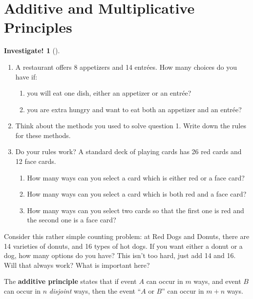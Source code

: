\documentclass[12pt,]{book}
\newcommand{\terminology}[1]{\textbf{#1}}
\theoremstyle{plain}
\theoremstyle{definition}
\theoremstyle{definition}
\theoremstyle{definition}
\newtheorem{investigation}[project]{Investigate!}
\numberwithin{equation}{chapter}
\begin{document}
\section[{Additive and Multiplicative Principles}]{Additive and Multiplicative Principles}\label{sec_counting-addmult}
\begin{investigation}[]\label{investigation-10}
\hypertarget{p-700}{}%
%
\begin{enumerate}
\item\hypertarget{li-337}{}\hypertarget{p-701}{}%
A restaurant offers 8 appetizers and 14 entrées. How many choices do you have if: %
\begin{enumerate}
\item\hypertarget{li-338}{}you will eat one dish, either an appetizer or an entrée?%
\item\hypertarget{li-339}{}you are extra hungry and want to eat both an appetizer and an entrée?%
\end{enumerate}
%
\item\hypertarget{li-340}{}\hypertarget{p-702}{}%
Think about the methods you used to solve question 1. Write down the rules for these methods.%
\item\hypertarget{li-341}{}\hypertarget{p-703}{}%
Do your rules work? A standard deck of playing cards has 26 red cards and 12 face cards. %
\begin{enumerate}
\item\hypertarget{li-342}{}How many ways can you select a card which is either red or a face card?%
\item\hypertarget{li-343}{}How many ways can you select a card which is both red and a face card?%
\item\hypertarget{li-344}{}How many ways can you select two cards so that the first one is red and the second one is a face card?%
\end{enumerate}
%
\end{enumerate}
%
\end{investigation}
\hypertarget{p-704}{}%
Consider this rather simple counting problem: at Red Dogs and Donuts, there are 14 varieties of donuts, and 16 types of hot dogs. If you want either a donut or a dog, how many options do you have? This isn't too hard, just add 14 and 16. Will that always work? What is important here?%
\begin{assemblage}\label{assemblage-11}
\hypertarget{p-705}{}%
The \terminology{additive principle} states that if event \(A\) can occur in \(m\) ways, and event \(B\) can occur in \(n\) \emph{disjoint} ways, then the event ``\(A\) or \(B\)'' can occur in \(m + n\) ways.%
\end{assemblage}
\end{document}
